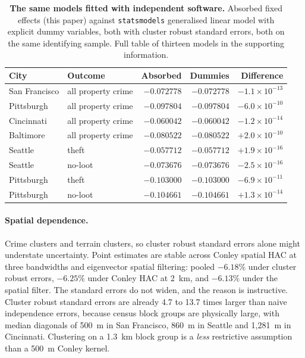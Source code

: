 \documentclass[12pt,letterpaper]{article}
\begin{document}
\begin{table}[!ht]
\centering
\caption{{\bf The same models fitted with independent software.} Absorbed fixed
effects (this paper) against \texttt{statsmodels} generalised linear model with
explicit dummy variables, both with cluster robust standard errors, both on the same
identifying sample. Full table of thirteen models in the supporting information.}
\label{tab:estval}
\begin{tabular}{llrrr}
\toprule
City & Outcome & Absorbed & Dummies & Difference \\
\midrule
San Francisco & all property crime & $-0.072778$ & $-0.072778$ & $-1.1\times10^{-13}$ \\
Pittsburgh & all property crime & $-0.097804$ & $-0.097804$ & $-6.0\times10^{-10}$ \\
Cincinnati & all property crime & $-0.060042$ & $-0.060042$ & $-1.2\times10^{-14}$ \\
Baltimore & all property crime & $-0.080522$ & $-0.080522$ & $+2.0\times10^{-10}$ \\
Seattle & theft & $-0.057712$ & $-0.057712$ & $+1.9\times10^{-16}$ \\
Seattle & no-loot & $-0.073676$ & $-0.073676$ & $-2.5\times10^{-16}$ \\
Pittsburgh & theft & $-0.103000$ & $-0.103000$ & $-6.9\times10^{-11}$ \\
Pittsburgh & no-loot & $-0.104661$ & $-0.104661$ & $+1.3\times10^{-14}$ \\
\bottomrule
\end{tabular}
\end{table}

\paragraph{Spatial dependence.} Crime clusters and terrain clusters, so cluster robust
standard errors alone might understate uncertainty. Point estimates are stable across
Conley spatial HAC \citep{conley1999} at three bandwidths and eigenvector spatial
filtering: pooled
$-6.18\%$ under cluster robust errors, $-6.25\%$ under Conley HAC at 2~km, and
$-6.13\%$ under the spatial filter. The standard errors do not widen, and the reason
is instructive. Cluster robust standard errors are already 4.7 to 13.7 times larger
than naive independence errors, because census block groups are physically large, with
median diagonals of 500~m in San Francisco, 860~m in Seattle and 1,281~m in
Cincinnati. Clustering on a 1.3~km block group is a \emph{less} restrictive assumption
than a 500~m Conley kernel.
\end{document}
